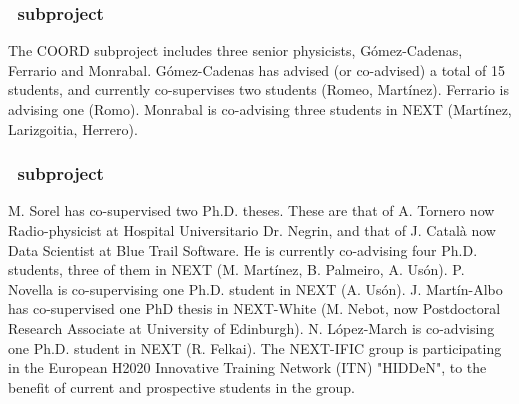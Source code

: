 \subsubsection*{\sDIPC\ subproject}
The COORD subproject includes three senior physicists, G\'omez-Cadenas, Ferrario and Monrabal. G\'omez-Cadenas has advised (or co-advised) a total of 15 students, and currently co-supervises two students (Romeo, Mart\'inez).  Ferrario is advising one (Romo). Monrabal is co-advising three students in NEXT (Mart\'{i}nez, Larizgoitia, Herrero).


\subsubsection*{\sIFIC\ subproject}
M. Sorel has co-supervised two Ph.D. theses. These are that of
A. Tornero 
now Radio-physicist at Hospital
Universitario Dr. Negrin, and that of J. Catal\`a 
now Data Scientist at Blue Trail Software. He is currently co-advising four Ph.D. students, three of them in NEXT (M. Mart\'{i}nez, B. Palmeiro, A. Us\'on). P. Novella is co-supervising one Ph.D. student in NEXT (A. Us\'on). J. Mart\'in-Albo has co-supervised one PhD thesis in NEXT-White (M. Nebot, 
now Postdoctoral Research Associate at University of Edinburgh). 
N. L\'opez-March is co-advising one Ph.D. student in NEXT (R. Felkai). The NEXT-IFIC group is participating in the European H2020 Innovative Training Network (ITN) "HIDDeN", to the benefit of current and prospective students in the group.



